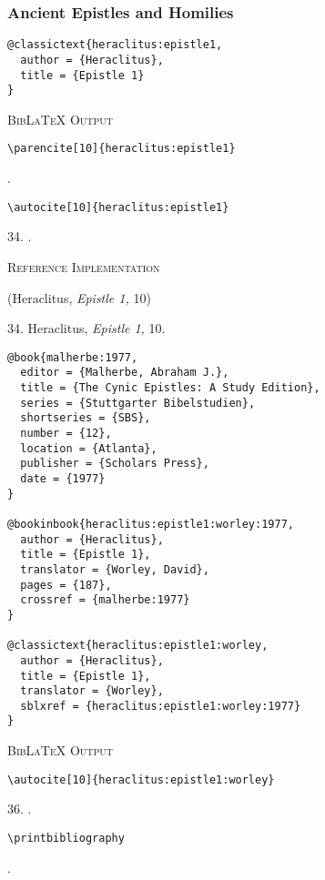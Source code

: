 \documentclass[a4paper]{article}
\newenvironment{refimp}{%
  \begin{minipage}{\linewidth}
    \setlength{\parskip}{1ex}
    \textsc{Reference Implementation}\par
    \nobreak
    \color{reference-colour}
}{\end{minipage}}
\begin{document}
\subsubsection{Ancient Epistles and Homilies}

\begin{lstlisting}
@classictext{heraclitus:epistle1,
  author = {Heraclitus},
  title = {Epistle 1}
}
\end{lstlisting}

{\textsc{BibLaTeX Output}\par
  \nobreak
  \texttt{\textbackslash parencite[10]\{heraclitus:epistle1\}}\par
  \color{biblatex-colour}
  \parencite[10]{heraclitus:epistle1}.\par
  \color{black}
  \texttt{\textbackslash autocite[10]\{heraclitus:epistle1\}}\par
  \color{biblatex-colour}
34. \cite[10]{heraclitus:epistle1}.\par}

\begin{refimp}
  (Heraclitus, \emph{Epistle 1,} 10)

  34. Heraclitus, \emph{Epistle 1,} 10.
\end{refimp}

\begin{lstlisting}
@book{malherbe:1977,
  editor = {Malherbe, Abraham J.},
  title = {The Cynic Epistles: A Study Edition},
  series = {Stuttgarter Bibelstudien},
  shortseries = {SBS},
  number = {12},
  location = {Atlanta},
  publisher = {Scholars Press},
  date = {1977}
}

@bookinbook{heraclitus:epistle1:worley:1977,
  author = {Heraclitus},
  title = {Epistle 1},
  translator = {Worley, David},
  pages = {187},
  crossref = {malherbe:1977}
}

@classictext{heraclitus:epistle1:worley,
  author = {Heraclitus},
  title = {Epistle 1},
  translator = {Worley},
  sblxref = {heraclitus:epistle1:worley:1977}
}
\end{lstlisting}

{\textsc{BibLaTeX Output}\par
  \nobreak
  \texttt{\textbackslash autocite[10]\{heraclitus:epistle1:worley\}}\par
  \color{biblatex-colour}
  36. \cite[10]{heraclitus:epistle1:worley}.\par
  \color{black}
  \texttt{\textbackslash printbibliography}\par
  \color{biblatex-colour}
  \hangindent\bibindent{}.\par
\hangindent\bibindent{}}
\end{document}
